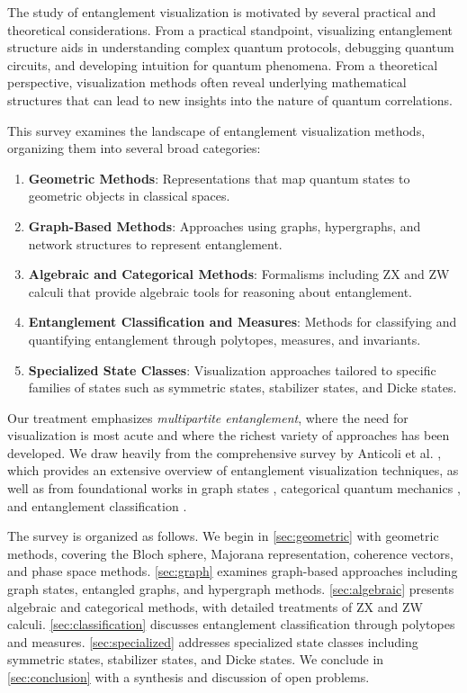 \documentclass[12pt,a4paper]{article}
\begin{document}
The study of entanglement visualization is motivated by several practical and theoretical considerations. From a practical standpoint, visualizing entanglement structure aids in understanding complex quantum protocols, debugging quantum circuits, and developing intuition for quantum phenomena. From a theoretical perspective, visualization methods often reveal underlying mathematical structures that can lead to new insights into the nature of quantum correlations.

This survey examines the landscape of entanglement visualization methods, organizing them into several broad categories:

\begin{enumerate}
	\item \textbf{Geometric Methods}: Representations that map quantum states to geometric objects in classical spaces.
	\item \textbf{Graph-Based Methods}: Approaches using graphs, hypergraphs, and network structures to represent entanglement.
	\item \textbf{Algebraic and Categorical Methods}: Formalisms including ZX and ZW calculi that provide algebraic tools for reasoning about entanglement.
	\item \textbf{Entanglement Classification and Measures}: Methods for classifying and quantifying entanglement through polytopes, measures, and invariants.
	\item \textbf{Specialized State Classes}: Visualization approaches tailored to specific families of states such as symmetric states, stabilizer states, and Dicke states.
\end{enumerate}

Our treatment emphasizes \emph{multipartite entanglement}, where the need for visualization is most acute and where the richest variety of approaches has been developed. We draw heavily from the comprehensive survey by Anticoli et al. \cite{Undermind}, which provides an extensive overview of entanglement visualization techniques, as well as from foundational works in graph states \cite{hein2004entanglement,hein2006multiparty}, categorical quantum mechanics \cite{cqm}, and entanglement classification \cite{EntangledGraphs}.

The survey is organized as follows. We begin in \cref{sec:geometric} with geometric methods, covering the Bloch sphere, Majorana representation, coherence vectors, and phase space methods. \cref{sec:graph} examines graph-based approaches including graph states, entangled graphs, and hypergraph methods. \cref{sec:algebraic} presents algebraic and categorical methods, with detailed treatments of ZX and ZW calculi. \cref{sec:classification} discusses entanglement classification through polytopes and measures. \cref{sec:specialized} addresses specialized state classes including symmetric states, stabilizer states, and Dicke states. We conclude in \cref{sec:conclusion} with a synthesis and discussion of open problems.
\end{document}
